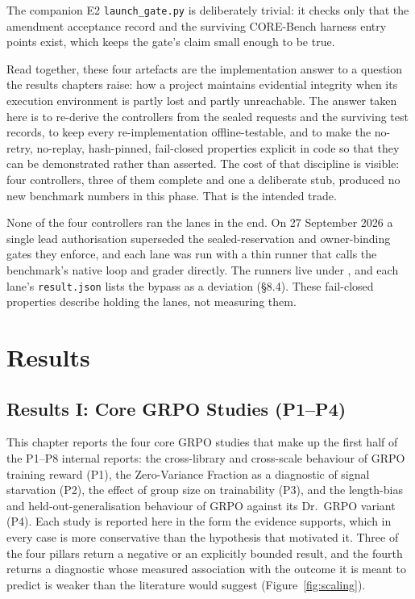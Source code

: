 \documentclass[12pt,a4paper]{report}
\DeclareRobustCommand{\longtok}[1]{\texttt{\seqsplit{#1}}}
\begin{document}
The companion E2 \texttt{launch\_gate.py} is deliberately trivial: it
checks only that the amendment acceptance record and the surviving
CORE-Bench harness entry points exist, which keeps the gate's claim
small enough to be true.

Read together, these four artefacts are the implementation answer to a
question the results chapters raise: how a project maintains evidential
integrity when its execution environment is partly lost and partly
unreachable. The answer taken here is to re-derive the controllers from
the sealed requests and the surviving test records, to keep every
re-implementation offline-testable, and to make the no-retry, no-replay,
hash-pinned, fail-closed properties explicit in code so that they can be
demonstrated rather than asserted. The cost of that discipline is
visible: four controllers, three of them complete and one a deliberate
stub, produced no new benchmark numbers in this phase. That is the
intended trade.

None of the four controllers ran the lanes in the end. On 27 September
2026 a single lead authorisation superseded the sealed-reservation and
owner-binding gates they enforce, and each lane was run with a thin
runner that calls the benchmark's native loop and grader directly. The
runners live under
\longtok{outputs/finish\_\allowbreak{}pending\_\allowbreak{}2026-09-27/\textless{}lane\textgreater{}/code/},
and each lane's \texttt{result.json} lists the bypass as a deviation
(§8.4). These fail-closed properties describe holding the lanes, not
measuring them.



\part{Results}


\chapter{Results I: Core GRPO Studies
(P1--P4)}\label{results-i-core-grpo-studies-p1p4}

This chapter reports the four core GRPO studies that make up the first
half of the P1--P8 internal reports: the cross-library and cross-scale
behaviour of GRPO training reward (P1), the Zero-Variance Fraction as a
diagnostic of signal starvation (P2), the effect of group size on
trainability (P3), and the length-bias and held-out-generalisation
behaviour of GRPO against its Dr.~GRPO variant (P4). Each study is
reported here in the form the evidence supports, which in every case is
more conservative than the hypothesis that motivated it. Three of the
four pillars return a negative or an explicitly bounded result, and the
fourth returns a diagnostic whose measured association with the outcome
it is meant to predict is weaker than the literature would suggest (Figure~\ref{fig:scaling}).
\end{document}

